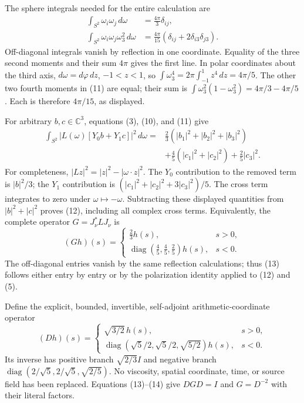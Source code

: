 The sphere integrals needed for the entire calculation are \[
\begin{aligned}
\int_{S^2}\omega_i\omega_j\,d\omega&=\frac{4\pi}{3}\delta_{ij},\\
\int_{S^2}\omega_i\omega_j\omega_3^2\,d\omega
&=\frac{4\pi}{15}(\delta_{ij}+2\delta_{i3}\delta_{j3}).
\end{aligned}
\tag{11}
\] Off-diagonal integrals vanish by reflection in one coordinate. Equality of the three second moments and their sum \(4\pi\) gives the first line. In polar coordinates about the third axis, \(d\omega=d\varphi\,dz\), \(-1<z<1\), so \(\int\omega_3^4=2\pi\int_{-1}^1z^4\,dz=4\pi/5\). The other two fourth moments in (11) are equal; their sum is \(\int\omega_3^2(1-\omega_3^2)=4\pi/3-4\pi/5\). Each is therefore \(4\pi/15\), as displayed.

For arbitrary \(b,c\in\mathbb C^3\), equations (3), (10), and (11) give \[
\begin{aligned}
\int_{S^2}|L(\omega)[Y_0b+Y_1c]|^2\,d\omega
={}&\frac23(|b_1|^2+|b_2|^2+|b_3|^2)\\
&+\frac45(|c_1|^2+|c_2|^2)+\frac25|c_3|^2.
\end{aligned}
\tag{12}
\] For completeness, \(|Lz|^2=|z|^2-|\omega\cdot z|^2\). The \(Y_0\) contribution to the removed term is \(|b|^2/3\); the \(Y_1\) contribution is \((|c_1|^2+|c_2|^2+3|c_3|^2)/5\). The cross term integrates to zero under \(\omega\mapsto-\omega\). Subtracting these displayed quantities from \(|b|^2+|c|^2\) proves (12), including all complex cross terms. Equivalently, the complete operator \(G=J_\nu^*LJ_\nu\) is \[
(Gh)(s)=
\begin{cases}
\frac23 h(s),&s>0,\\
\operatorname{diag}(\frac45,\frac45,\frac25)h(s),&s<0.
\end{cases}
\tag{13}
\] The off-diagonal entries vanish by the same reflection calculations; thus (13) follows either entry by entry or by the polarization identity applied to (12) and (5).

Define the explicit, bounded, invertible, self-adjoint arithmetic-coordinate operator \[
(Dh)(s)=
\begin{cases}
\sqrt{3/2}\,h(s),&s>0,\\
\operatorname{diag}(\sqrt5/2,\sqrt5/2,\sqrt{5/2})h(s),&s<0.
\end{cases}
\tag{14}
\] Its inverse has positive branch \(\sqrt{2/3}I\) and negative branch \(\operatorname{diag}(2/\sqrt5,2/\sqrt5,\sqrt{2/5})\). No viscosity, spatial coordinate, time, or source field has been replaced. Equations (13)--(14) give \(DGD=I\) and \(G=D^{-2}\) with their literal factors.

